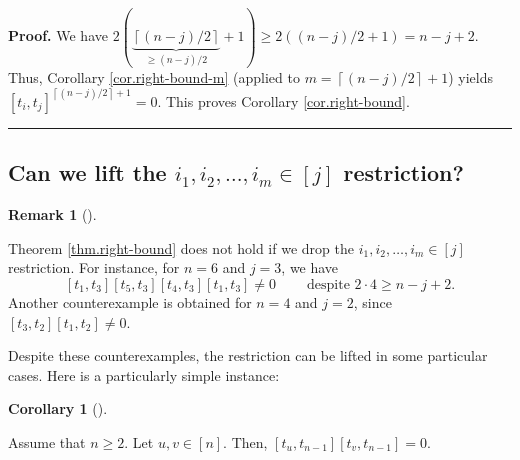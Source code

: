\documentclass[numbers=enddot,12pt,final,onecolumn,notitlepage]{scrartcl}%
\theoremstyle{definition}
\newtheorem{remk}[theo]{Remark}
\newenvironment{remark}[1][]
{\begin{remk}[#1]\begin{leftbar}}
{\end{leftbar}\end{remk}}
\newtheorem{coro}[theo]{Corollary}
\newenvironment{corollary}[1][]
{\begin{coro}[#1]\begin{leftbar}}
{\end{leftbar}\end{coro}}
\newenvironment{proof}[1][Proof]{\noindent\textbf{#1.} }{\ \rule{0.5em}{0.5em}}
\begin{document}
\begin{proof}
We have $2\left(  \underbrace{\left\lceil \left(  n-j\right)  /2\right\rceil
}_{\geq\left(  n-j\right)  /2}+1\right)  \geq2\left(  \left(  n-j\right)
/2+1\right)  =n-j+2$. Thus, Corollary \ref{cor.right-bound-m} (applied to
$m=\left\lceil \left(  n-j\right)  /2\right\rceil +1$) yields $\left[
t_{i},t_{j}\right]  ^{\left\lceil \left(  n-j\right)  /2\right\rceil +1}=0$.
This proves Corollary \ref{cor.right-bound}.
\end{proof}

\subsection{\label{subsec.ikinn}Can we lift the $i_{1},i_{2},\ldots,i_{m}%
\in\left[  j\right]  $ restriction?}

\begin{remark}
Theorem \ref{thm.right-bound} does not hold if we drop the $i_{1},i_{2}%
,\ldots,i_{m}\in\left[  j\right]  $ restriction. For instance, for $n=6$ and
$j=3$, we have%
\[
\left[  t_{1},t_{3}\right]  \left[  t_{5},t_{3}\right]  \left[  t_{4}%
,t_{3}\right]  \left[  t_{1},t_{3}\right]  \neq
0\ \ \ \ \ \ \ \ \ \ \text{despite }2\cdot4\geq n-j+2.
\]
Another counterexample is obtained for $n=4$ and $j=2$, since $\left[
t_{3},t_{2}\right]  \left[  t_{1},t_{2}\right]  \neq0$.
\end{remark}

Despite these counterexamples, the restriction can be lifted in some
particular cases. Here is a particularly simple instance:

\begin{corollary}
\label{cor.titn-1}Assume that $n\geq2$. Let $u,v\in\left[  n\right]  $. Then,
$\left[  t_{u},t_{n-1}\right]  \left[  t_{v},t_{n-1}\right]  =0$.
\end{corollary}
\end{document}
